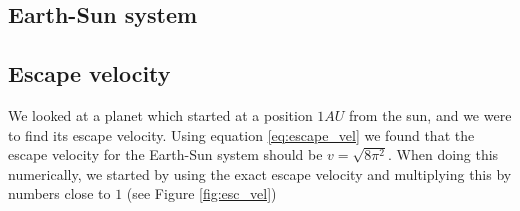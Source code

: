 \documentclass[%
 reprint,
 nobalance,
 amsmath,amssymb,
 aps,
]{revtex4-1}
\begin{document}
\subsection{\label{sec:Sub1}Earth-Sun system}



\subsection{\label{sec:Sub1.5}Escape velocity}

We looked at a planet which started at a position $1AU$ from the sun, and we were to find its escape velocity. Using equation \ref{eq:escape_vel} we found that the escape velocity for the Earth-Sun system should be $v = \sqrt{8\pi^2}$. When doing this numerically, we started by using the exact escape velocity and multiplying this by numbers close to $1$ (see Figure \ref{fig:esc_vel})
\end{document}
